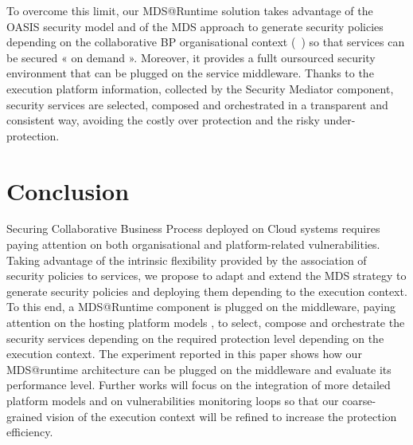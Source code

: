 \documentclass[runningheads,a4paper]{llncs}
\begin{document}
To overcome this limit, our MDS@Runtime solution takes advantage of the OASIS security model and of the MDS approach to generate security policies depending on the collaborative BP organisational context (~\cite{OFG13}) so that services can be secured « on demand ». Moreover, it provides a fullt oursourced security environment that can be plugged on the service middleware. Thanks to the execution platform information, collected by the Security Mediator component, security services are selected, composed and orchestrated in a transparent and consistent way, avoiding the costly over protection and the risky under-protection.




\section{Conclusion}
Securing Collaborative Business Process deployed on Cloud systems requires paying attention on both organisational and platform-related vulnerabilities. Taking advantage of the intrinsic flexibility provided by the association of security policies to services, we propose to adapt and extend the MDS strategy to generate security policies and deploying them depending to the execution context. To this end, a MDS@Runtime component is plugged on the middleware, paying attention on the hosting platform models , to select, compose and orchestrate the security services depending on the required protection level depending on the execution context.  The experiment reported in this paper shows how our MDS@runtime architecture can be plugged on the middleware and evaluate its performance level.
Further works will focus on the integration of more detailed platform models and on vulnerabilities monitoring loops so that our coarse-grained vision of the execution context will be refined to increase the protection efficiency.
\end{document}
